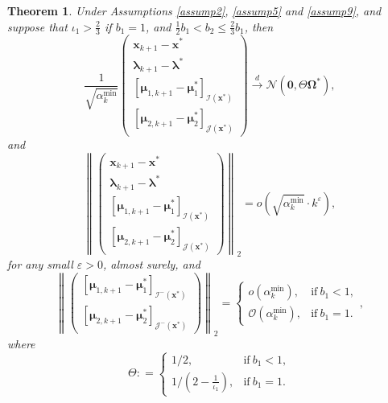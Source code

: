 \documentclass[aos]{imsart}
\numberwithin{equation}{section}
\theoremstyle{plain}
\newtheorem{theorem}{Theorem}
\begin{document}
\begin{theorem}
\label{theorem_asymptotic_almost_sure}
    Under Assumptions \ref{assump2}, \ref{assump5} and  \ref{assump9}, and suppose that $\iota_1>\frac{2}{3}$ if $b_1=1$, and $\frac{1}{2} b_1 < b_2 \leq \frac{2}{3}b_1$, then 
    \begin{equation}
        \frac{1}{\sqrt{\alpha_k^{\text{min}}}} \left( \begin{array}{c}
    \bm{x}_{k+1} - \bm{x}^{*}  \\
    \bm{\lambda}_{k+1} - \bm{\lambda}^{*} \\
    \left[ \bm{\mu}_{1,k+1} - \bm{\mu}_{1}^{*}\right]_{\mathcal{I}(\bm{x}^{*})} \\
    \left[ \bm{\mu}_{2,k+1} - \bm{\mu}_{2}^{*} \right]_{\mathcal{J}(\bm{x}^{*})} 
    \end{array} \right) \stackrel{d}{\longrightarrow} \mathcal{N} \left( \bm{0}, \Theta \bm{\Omega}^{*} \right),
    \end{equation}
    and
    \begin{equation}
        \left\| \left( \begin{array}{c}
    \bm{x}_{k+1} - \bm{x}^{*}  \\
    \bm{\lambda}_{k+1} - \bm{\lambda}^{*} \\
    \left[ \bm{\mu}_{1,k+1} - \bm{\mu}_{1}^{*}\right]_{\mathcal{I}(\bm{x}^{*})} \\
    \left[ \bm{\mu}_{2,k+1} - \bm{\mu}_{2}^{*} \right]_{\mathcal{J}(\bm{x}^{*})}
    \end{array} \right)  \right\|_2 = o\left( \sqrt{\alpha_k^{\text{min}}} \cdot k^{\varepsilon} \right),
    \end{equation}
    for any small $\varepsilon > 0$, almost surely,
    and
    \begin{equation}
        \left\| \left( \begin{array}{cc}
             \left[ \bm{\mu}_{1,k+1} - \bm{\mu}_{1}^{*}\right]_{\mathcal{I}^{-}(\bm{x}^{*})} \\
            \left[ \bm{\mu}_{2,k+1} - \bm{\mu}_{2}^{*} \right]_{\mathcal{J}^{-}(\bm{x}^{*})} 
        \end{array} \right) \right\|_2 = \left\{ \begin{array}{cc}
               o\left( \alpha_k^{\text{min}}\right),  & \text{if}~b_1 < 1, \\
               \mathcal{O}\left( \alpha_k^{\text{min}}\right),  & \text{if}~b_1 = 1.
            \end{array} \right.,
    \end{equation}
    where
    \begin{equation*}
        \Theta : = \left\{ \begin{array}{cc}
               1/2,  & \text{if}~b_1 < 1, \\
               1/\left(2 - \frac{1}{\iota_1}\right),  & \text{if}~b_1 = 1.
            \end{array} \right.
    \end{equation*}
    
\end{theorem}
\end{document}
